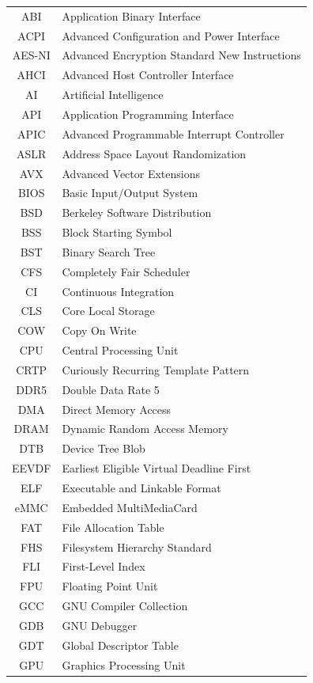 \documentclass[a4paper,10pt,twoside]{report}
\theoremstyle{definition}
\begin{document}
\begin{supertabular}{cl}
ABI & Application Binary Interface \\
ACPI & Advanced Configuration and Power Interface \\
AES-NI & Advanced Encryption Standard New Instructions \\
AHCI & Advanced Host Controller Interface \\
AI & Artificial Intelligence \\
API & Application Programming Interface \\
APIC & Advanced Programmable Interrupt Controller \\
ASLR & Address Space Layout Randomization \\
AVX & Advanced Vector Extensions \\
BIOS & Basic Input/Output System \\
BSD & Berkeley Software Distribution \\
BSS & Block Starting Symbol \\
BST & Binary Search Tree \\
CFS & Completely Fair Scheduler \\
CI & Continuous Integration \\
CLS & Core Local Storage \\
COW & Copy On Write \\
CPU & Central Processing Unit \\
CRTP & Curiously Recurring Template Pattern \\
DDR5 & Double Data Rate 5 \\
DMA & Direct Memory Access \\
DRAM & Dynamic Random Access Memory \\
DTB & Device Tree Blob \\
EEVDF & Earliest Eligible Virtual Deadline First \\
ELF & Executable and Linkable Format \\
eMMC & Embedded MultiMediaCard \\
FAT & File Allocation Table \\
FHS & Filesystem Hierarchy Standard \\
FLI & First-Level Index \\
FPU & Floating Point Unit \\
GCC & GNU Compiler Collection \\
GDB & GNU Debugger \\
GDT & Global Descriptor Table \\
GPU & Graphics Processing Unit \\

\end{supertabular}
\end{document}
